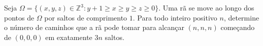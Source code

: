 Seja \(\Omega =\{ (x,y,z)\in \mathbb{Z}^3:y+1\geqslant x\geqslant y\geqslant z\geqslant 0\}\). Uma rã se move ao longo dos pontos de \(\Omega\) por saltos de comprimento \(1\). Para todo inteiro positivo \(n\), determine o número de caminhos que a rã pode tomar para alcançar \((n,n,n)\) começando de \((0,0,0)\) em exatamente \(3n\) saltos.
